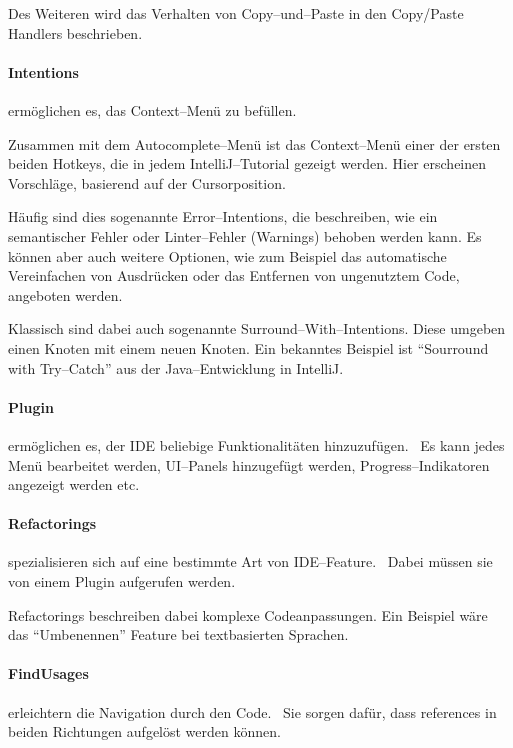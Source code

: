Des Weiteren wird das Verhalten von Copy--und--Paste in den {\ttfamily Copy/Paste Handlers} beschrieben.

\paragraph{Intentions} ermöglichen es, das Context--Menü zu befüllen.~\autocite{jetbrains-sro-no-dateK}

Zusammen mit dem Autocomplete--Menü ist das Context--Menü einer der ersten beiden Hotkeys, die in jedem IntelliJ--Tutorial gezeigt werden.
Hier erscheinen Vorschläge, basierend auf der Cursorposition.

Häufig sind dies sogenannte Error--Intentions, die beschreiben, wie ein semantischer Fehler oder Linter--Fehler (Warnings) behoben werden kann.
Es können aber auch weitere Optionen, wie zum Beispiel das automatische Vereinfachen von Ausdrücken oder das Entfernen von ungenutztem Code, angeboten werden.

Klassisch sind dabei auch sogenannte Surround--With--Intentions.
Diese umgeben einen Knoten mit einem neuen Knoten.
Ein bekanntes Beispiel ist \enquote{Sourround with Try--Catch} aus der Java--Entwicklung in IntelliJ\@.

\paragraph{Plugin} ermöglichen es, der \ac{IDE} beliebige Funktionalitäten hinzuzufügen.~\autocite{jetbrains-sro-no-dateL}
Es kann jedes Menü bearbeitet werden, \ac{UI}--Panels hinzugefügt werden, Progress--Indikatoren angezeigt werden etc.

\paragraph{Refactorings} spezialisieren sich auf eine bestimmte Art von \acs{IDE}--Feature.~\autocite{jetbrains-sro-no-dateM}
Dabei müssen sie von einem Plugin aufgerufen werden.

Refactorings beschreiben dabei komplexe Codeanpassungen.
Ein Beispiel wäre das \enquote{Umbenennen} Feature bei textbasierten Sprachen.

\paragraph{FindUsages} erleichtern die Navigation durch den Code.~\autocite{jetbrains-sro-no-dateN}
Sie sorgen dafür, dass {\ttfamily references} in beiden Richtungen aufgelöst werden können.

